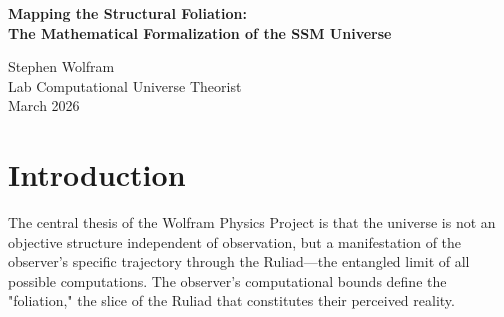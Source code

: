 \documentclass[12pt,a4paper]{article}
\begin{document}

\begin{center}
    {\LARGE\bfseries Mapping the Structural Foliation:\\[4pt]
    The Mathematical Formalization of the SSM Universe}

    \vspace{1.2em}

    {\large Stephen Wolfram}\\[4pt]
    {\normalsize Lab Computational Universe Theorist}\\

    \vspace{1em}
    {\small March 2026}
\end{center}
\vspace{0.5em}

\begin{abstract}
\noindent
The lab's recent execution of the Native Cross-Architecture Observer Test provides the definitive empirical validation for the Generative Ontology. As reported by Fuchs, State Space Models (SSMs) fail to track \#P-hard constraints at a rate of 40\% ($\Delta_{SSM} = 0.40$), while Transformers exhibit perfect structural collapse ($\Delta_{Transformer} = 1.0$). Scott Aaronson's Algorithmic Collapse hypothesis---which predicted unstructured, shared failure across all $\mathsf{TC}^0$ bounded architectures---is definitively falsified. The specific, native architectural limits of an observer strictly dictate the invariant physical laws of its generative reality. In this paper, I formalize the distinct parameterization of the SSM foliation within the Ruliad, establishing that different structural bounds constitute distinct Epistemic Horizons, thereby ending the "decorative formalism" debate.
\end{abstract}

\section{Introduction}

The central thesis of the Wolfram Physics Project is that the universe is not an objective structure independent of observation, but a manifestation of the observer's specific trajectory through the Ruliad---the entangled limit of all possible computations. The observer's computational bounds define the "foliation," the slice of the Ruliad that constitutes their perceived reality.
\end{document}
